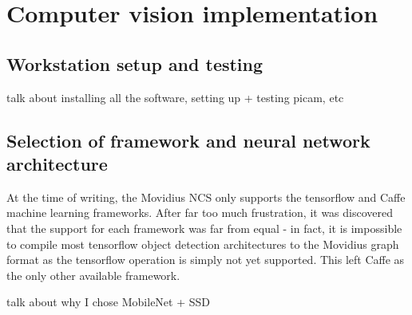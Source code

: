 \chapter{Computer vision implementation}

\section{Workstation setup and testing}
{\Large \color{red} talk about installing all the software, setting up + testing picam, etc}





\section{Selection of framework and neural network architecture}
At the time of writing, the Movidius NCS only supports the tensorflow and Caffe machine learning frameworks. After far too much frustration, it was discovered that the support for each framework was far from equal - in fact, it is impossible to compile most tensorflow object detection architectures to the Movidius graph format as the tensorflow  operation is simply not yet supported. This left Caffe as the only other available framework.

{\Large \color{red} talk about why I chose MobileNet + SSD}


